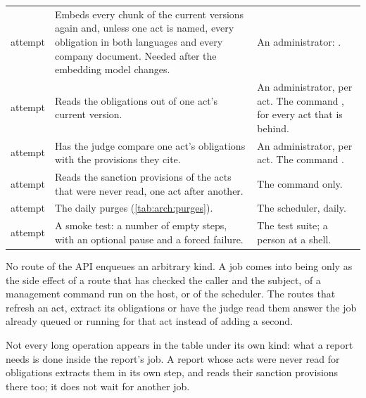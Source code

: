 \begin{xltabular}{\textwidth}{@{}L{37mm}YL{43mm}@{}}
\newline {} attempt & Embeds every chunk of the current versions again and, unless one act is named, every obligation in both languages and every company document. Needed after the embedding model changes. & An administrator: . \\
\newline {} attempt & Reads the obligations out of one act's current version. & An administrator, per act. The command , for every act that is behind. \\
\newline {} attempt & Has the judge compare one act's obligations with the provisions they cite. & An administrator, per act. The command . \\
\newline {} attempt & Reads the sanction provisions of the acts that were never read, one act after another. & The command  only. \\
\newline {} attempt & The daily purges (\cref{tab:arch:purges}). & The scheduler, daily. \\
\newline {} attempt & A smoke test: a number of empty steps, with an optional pause and a forced failure. & The test suite; a person at a shell. \\
\end{xltabular}

No route of the API enqueues an arbitrary kind. A job comes into being only as the side
effect of a route that has checked the caller and the subject, of a management command run on
the host, or of the scheduler. The routes that refresh an act, extract its obligations or have
the judge read them answer the job already queued or running for that act instead of adding
a second.

Not every long operation appears in the table under its own kind: what a report needs is
done inside the report's job. A report whose acts were never read for obligations extracts
them in its own  step, and reads their sanction provisions there too; it
does not wait for another job.

